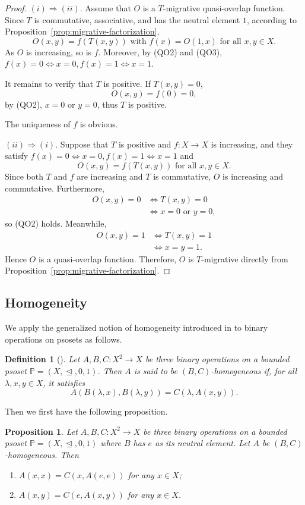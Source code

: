 \documentclass[preprint,12pt]{elsarticle}
\newtheorem{proposition}[theorem]{Proposition}
\newtheorem{definition}[theorem]{Definition}
\begin{document}
\begin{proof}
$(i)\Rightarrow(ii)$.
Assume that $O$ is a $T$-migrative quasi-overlap function. Since $T$
is commutative, associative, and has the neutral element $1$,
 according to Proposition~\ref{prop:migrative-factorization},
$$O(x,y)=f(T(x,y))\mbox{ with }f(x)=O(1,x)\mbox{ for all $x,y\in X$}.$$
As $O$ is increasing, so is $f$. Moreover, by (QO2) and (QO3),
$f(x)=0\Longleftrightarrow x=0, f(x)=1\Longleftrightarrow x=1.$

It remains to verify that $T$ is positive. If $T(x,y)=0$,
$$
 O(x,y)=f(0)=0,
$$
by (QO2), $x=0$ or $y=0$, thus $T$ is positive.

The uniqueness of $f$ is obvious.

$(ii)\Rightarrow(i)$. Suppose that $T$ is positive and $f:X\to X$ is increasing, and they satisfy
$f(x)=0\Longleftrightarrow x=0,
 f(x)=1\Longleftrightarrow x=1$
and
$$
 O(x,y)=f(T(x,y))\mbox{ for all $x,y\in X$}.
$$
Since both $T$ and $f$ are increasing and $T$ is commutative, $O$ is
increasing and commutative. Furthermore,
$$
\begin{aligned}
 O(x,y)=0
 &\Longleftrightarrow T(x,y)=0\\
 &\Longleftrightarrow x=0\mbox{ or }y=0,
\end{aligned}
$$
so (QO2) holds. Meanwhile,
$$
\begin{aligned}
 O(x,y)=1
 &\Longleftrightarrow T(x,y)=1\\
 &\Longleftrightarrow x=y=1.
 \end{aligned}
$$
Hence $O$ is a quasi-overlap function. Therefore, $O$ is $T$-migrative directly from Proposition~\ref{prop:migrative-factorization}.
\end{proof}

\subsection{Homogeneity}
We apply the generalized notion of homogeneity introduced in \cite{Qiao2021} to binary operations on psosets as follows.
\begin{definition}[\cite{Qiao2021}]\label{def:homogeneity}
\emph{Let $A,B,C:X^2\to X$ be three binary operations on a  bounded psoset $\mathbb{P}=(X,\trianglelefteq,0,1)$. Then $A$ is said to be $(B,C)$-\emph{homogeneous} if, for all $\lambda,x,y\in X$, it satisfies}
$$
 A(B(\lambda,x),B(\lambda,y))=C(\lambda,A(x,y)).
$$
\end{definition}

Then we first have the following proposition.
\begin{proposition}\label{prop:homogeneity-basic}
Let $A,B,C:X^2\to X$ be three binary operations on a bounded psoset $\mathbb{P}=(X,\trianglelefteq,0,1)$ where $B$ has $e$ as its neutral element. Let $A$ be $(B,C)$-homogeneous. Then
\begin{enumerate}[label=(\roman*)]
    \item $A(x,x)=C(x,A(e,e))$ for any $x\in X$;
    \item $A(x,y)=C(e,A(x,y))$ for any $x\in X$.
\end{enumerate}
\end{proposition}
\end{document}

